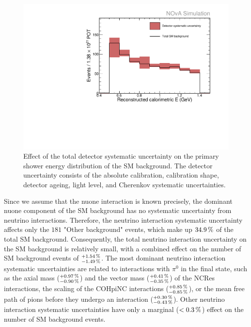 \begin{figure}[hbtp]
\centering
\includegraphics[width=.9\textwidth]{Plots/NuMM/SystShifts_detSysts_Full_Graph.pdf}
\caption[Detector systematic uncertainties]{Effect of the total detector systematic uncertainty on the primary shower energy distribution of the \acrshort{SM} background. The detector uncertainty consists of the absolute calibration, calibration shape, detector ageing, light level, and Cherenkov systematic uncertainties.}
\label{fig:NuMMDetSysts}
\end{figure}

Since we assume that the \gls{nuone} interaction is known precisely, the dominant \gls{nuone} component of the \gls{SM} background has no systematic uncertainty from neutrino interactions. Therefore, the neutrino interaction systematic uncertainty affects only the $181$ "Other background" events, which make up $\unit[34.9]{\%}$ of the total \gls{SM} background. Consequently, the total neutrino interaction uncertainty on the \gls{SM} background is relatively small, with a combined effect on the number of \gls{SM} background events of $^{+\unit[1.54]{\%}}_{-\unit[1.49]{\%}}$.
The most dominant neutrino interaction systematic uncertainties are related to interactions with $\pi^0$ in the final state,  such as the axial mass ($^{\unit[+0.97]{\%}}_{\unit[-0.90]{\%}}$) and the vector mass ($^{\unit[+0.41]{\%}}_{\unit[-0.35]{\%}}$) of the \gls{NC}\gls{Res} interactions, the scaling of the \gls{COHpi}\gls{NC} interactions ($^{\unit[+0.85]{\%}}_{\unit[-0.85]{\%}}$), or the mean free path of pions before they undergo an interaction ($^{\unit[+0.30]{\%}}_{\unit[-0.43]{\%}}$). Other neutrino interaction systematic uncertainties have only a marginal ($<\unit[0.3]{\%}$) effect on the number of \gls{SM} background events.

